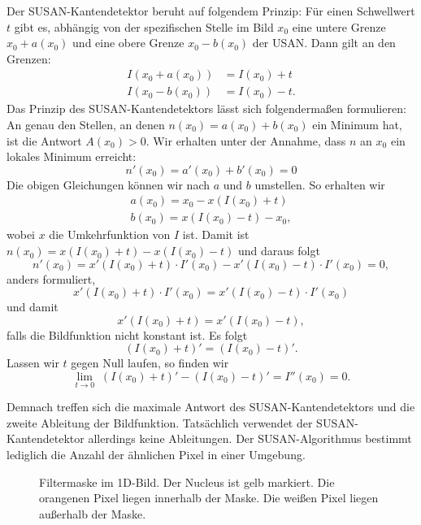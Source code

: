 \documentclass[a4paper, 11pt]{report}
\theoremstyle{definition}
\begin{document}
				Der SUSAN-Kantendetektor beruht auf folgendem Prinzip: Für einen Schwellwert $t$ gibt es, abhängig von der spezifischen Stelle im Bild $x_0$ eine untere Grenze $x_0+a(x_0)$ und eine obere Grenze $x_0-b(x_0)$ der USAN.
				Dann gilt an den Grenzen:
				\begin{align*}
					I(x_0 + a(x_0)) &= I(x_0) + t \\
					I(x_0 - b(x_0)) &= I(x_0) - t.
				\end{align*}
				Das Prinzip des SUSAN-Kantendetektors lässt sich folgendermaßen formulieren: An genau den Stellen, an denen $n(x_0) = a(x_0) + b(x_0)$ ein Minimum hat, ist die Antwort $A(x_0) > 0$. Wir erhalten unter der Annahme, dass $n$ an $x_0$ ein lokales Minimum erreicht:
				$$ n'(x_0) = a'(x_0) + b'(x_0) = 0 $$
				Die obigen Gleichungen können wir nach $a$ und $b$ umstellen. So erhalten wir
				\begin{align*}
					a(x_0) = x_0 - x(I(x_0) + t) \\
					b(x_0) = x(I(x_0) - t) - x_0,
				\end{align*}
				wobei $x$ die Umkehrfunktion von $I$ ist.
				Damit ist $n(x_0) = x(I(x_0) + t) - x(I(x_0) - t)$ und daraus folgt
				$$ n'(x_0) = x'(I(x_0) + t) \cdot I'(x_0) - x'(I(x_0) - t) \cdot I'(x_0) = 0,$$
				anders formuliert,
				$$ x'(I(x_0) + t) \cdot I'(x_0) = x'(I(x_0) - t) \cdot I'(x_0) $$
				und damit $$x'(I(x_0) + t) = x'(I(x_0) - t),$$
				falls die Bildfunktion nicht konstant ist.
	 			Es folgt 
	 			$$(I(x_0) + t)' = (I(x_0) - t)'.$$
	 			Lassen wir $t$ gegen Null laufen, so finden wir
	 			$$\lim_{t\to 0}\; (I(x_0) + t)' - (I(x_0) - t)' = I''(x_0) = 0. $$

	 			Demnach treffen sich die maximale Antwort des SUSAN-Kantendetektors und die zweite Ableitung der Bildfunktion. Tatsächlich verwendet der SUSAN-Kantendetektor allerdings keine Ableitungen. Der SUSAN-Algorithmus bestimmt lediglich die Anzahl der ähnlichen Pixel in einer Umgebung.

				\begin{figure}[H]
					\begin{center}
						\caption{Filtermaske im 1D-Bild. Der Nucleus ist gelb markiert. Die orangenen Pixel liegen innerhalb der Maske. Die weißen Pixel liegen außerhalb der Maske.}
						\label{fig:def_maske_1d}
					\end{center}
				\end{figure}
\end{document}
